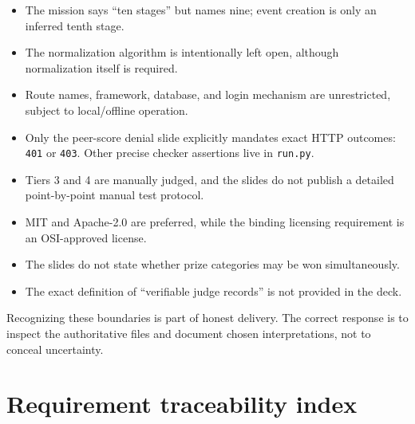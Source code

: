 \documentclass[11pt]{article}
\begin{document}
\begin{itemize}
  \item The mission says ``ten stages'' but names nine; event creation is only an inferred tenth stage.
  \item The normalization algorithm is intentionally left open, although normalization itself is required.
  \item Route names, framework, database, and login mechanism are unrestricted, subject to local/offline operation.
  \item Only the peer-score denial slide explicitly mandates exact HTTP outcomes: \texttt{401} or \texttt{403}. Other precise checker assertions live in \texttt{run.py}.
  \item Tiers 3 and 4 are manually judged, and the slides do not publish a detailed point-by-point manual test protocol.
  \item MIT and Apache-2.0 are preferred, while the binding licensing requirement is an OSI-approved license.
  \item The slides do not state whether prize categories may be won simultaneously.
  \item The exact definition of ``verifiable judge records'' is not provided in the deck.
\end{itemize}

Recognizing these boundaries is part of honest delivery. The correct response is to inspect the authoritative files and document chosen interpretations, not to conceal uncertainty.

\section{Requirement traceability index}
\end{document}
